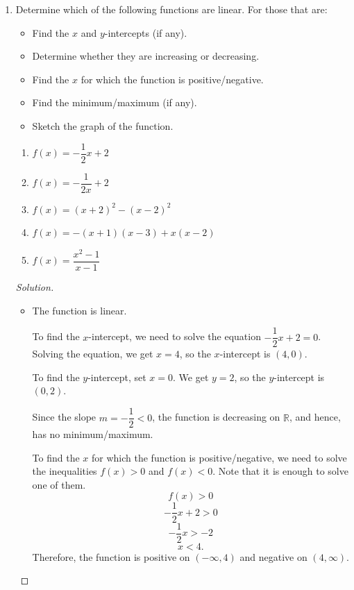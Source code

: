\documentclass[12pt]{article}
\newenvironment{solution}{\begin{proof}[Solution]}{\end{proof}}
\begin{document}
		\begin{enumerate}
			
		\item Determine which of the following functions are linear. For those that are:
		\begin{itemize} 
			\item Find the $x$ and $y$-intercepts (if any).
			\item Determine whether they are increasing or decreasing.
			\item Find the $x$ for which the function is positive/negative.
			\item Find the minimum/maximum (if any).
			\item Sketch the graph of the function.
		\end{itemize}
		\begin{enumerate}
			\item $f(x)=-\dfrac{1}{2}x+2$
		
			\item $f(x)=-\dfrac{1}{2x}+2$
			
			\item $f(x)=(x+2)^2-(x-2)^2$
		
			\item $f(x)=-(x+1)(x-3)+x(x-2)$
			
			\item $f(x)=\dfrac{x^2-1}{x-1}$
		
		\end{enumerate}
		
		
		\begin{solution}
			\begin{itemize}
				\item[(a)] The function is linear. 
				
				To find the $x$-intercept, we need to solve the equation $-\dfrac{1}{2}x+2=0$. Solving the equation, we get $x=4$, so the $x$-intercept is $(4,0)$.
				
				To find the $y$-intercept, set $x=0$. We get $y=2$, so the $y$-intercept is $(0,2)$. 
				
				Since the slope $m=-\dfrac{1}{2}<0$, the function is decreasing on $\mathbb{R}$, and hence, has no minimum/maximum.
				
				To find the $x$ for which the function is positive/negative, we need to solve the inequalities $f(x)>0$ and $f(x)<0$. Note that it is enough to solve one of them.
				$$f(x)>0$$
				$$-\dfrac{1}{2}x+2>0$$
				$$-\dfrac{1}{2}x>-2$$
				$$x<4.$$
				Therefore, the function is positive on $(-\infty,4)$ and negative on $(4,\infty)$.
				

\end{itemize}
\end{solution}
\end{enumerate}
\end{document}
